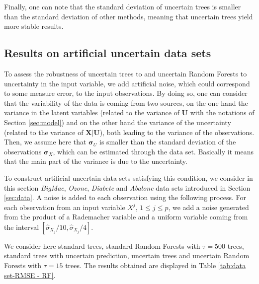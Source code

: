 \documentclass[twoside,11pt]{article}
\begin{document}
Finally, one can note that the standard deviation of uncertain trees is smaller than the standard deviation of other methods, meaning that uncertain trees yield more stable results.

\subsection{Results on artificial uncertain data sets}
\label{sec:arti}
To assess the robustness of uncertain trees to and uncertain Random Forests to uncertainty in the input variable, we add artificial noise, which could correspond to some measure error, to the input observations.
By doing so, one can consider that the variability of the data is coming from two sources, on the one hand the variance in the latent variables (related to the variance of $\mathbf{U}$ with the notations of Section \ref{sec:model}) and on the other hand the variance of the uncertainty (related to the variance of $\mathbf{X} | \mathbf{U}$), both leading to the variance of the observations.
Then, we assume here that $\boldsymbol{\sigma}_U$ is smaller than  the standard deviation of the observations $\boldsymbol{\sigma}_X$, which can be estimated through the data set. Basically it means that the main part of the variance is due to the uncertainty.

To construct artificial uncertain data sets satisfying this condition, we consider in this section \textit{BigMac}, \textit{Ozone}, \textit{Diabete} and \textit{Abalone} data sets introduced in Section \ref{sec:data}.
A noise is added to each observation using the following process. For each observation from an input variable $X^j$, $1\leq j \leq p$, we add a noise generated from the product of a Rademacher variable and a uniform variable coming from the interval $[\hat{\sigma}_{X_j}/10, \hat{\sigma}_{X_j}/4]$.

We consider here standard trees, standard Random Forests with $\tau = 500$ trees, standard trees with uncertain prediction, uncertain trees and uncertain Random Forests with $\tau = 15$ trees. The results obtained are displayed in Table \ref{tab:data set-RMSE - RF}.
\end{document}
